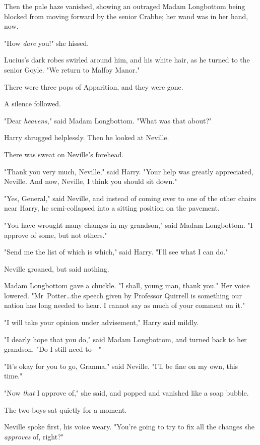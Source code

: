 Then the pale haze vanished, showing an outraged Madam Longbottom being blocked
from moving forward by the senior Crabbe; her wand was in her hand, now.

"How \emph{dare} you!" she hissed.

Lucius’s dark robes swirled around him, and his white hair, as he turned to the
senior Goyle. "We return to Malfoy Manor."

There were three pops of Apparition, and they were gone.

A silence followed.

"Dear \emph{heavens}," said Madam Longbottom. "What was that about?"

Harry shrugged helplessly. Then he looked at Neville.

There was sweat on Neville’s forehead.

"Thank you very much, Neville," said Harry. "Your help was greatly appreciated,
Neville. And now, Neville, I think you should sit down."

"Yes, General," said Neville, and instead of coming over to one of the other
chairs near Harry, he semi-collapsed into a sitting position on the pavement.

"You have wrought many changes in my grandson," said Madam Longbottom. "I
approve of some, but not others."

"Send me the list of which is which," said Harry. "I’ll see what I can do."

Neville groaned, but said nothing.

Madam Longbottom gave a chuckle. "I shall, young man, thank you." Her voice
lowered. "Mr~Potter…the speech given by Professor Quirrell is
something our nation has long needed to hear. I cannot say as much of your
comment on it."

"I will take your opinion under advisement," Harry said mildly.

"I dearly hope that you do," said Madam Longbottom, and turned back to her
grandson. "Do I still need to—"

"It’s okay for you to go, Granma," said Neville. "I’ll be fine on my own, this
time."

"Now \emph{that} I approve of," she said, and popped and vanished like a soap
bubble.

The two boys sat quietly for a moment.

Neville spoke first, his voice weary. "You’re going to try to fix all the
changes she \emph{approves} of, right?"

